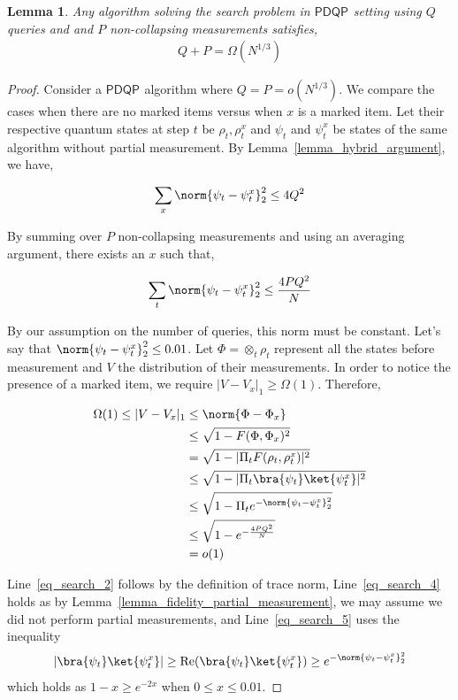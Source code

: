 \documentclass[10pt,a4paper]{article}
\newcommand{\queryamount}[0]{\ensuremath{Q}\xspace}
\newcommand{\abilityamount}[0]{\ensuremath{P}\xspace} %
\newcommand{\compclass}[2][]{\ensuremath{\mathsf{#2}^{#1}}\xspace}
\newcommand{\pdqpname}[0]{\compclass{PDQP}}
\newtheorem{lemma}[theorem]{Lemma}
\begin{document}
\begin{lemma}\label{lemma_lowerbound_search}
    Any algorithm solving the search problem in \pdqpname setting using \queryamount queries and and \abilityamount non-collapsing measurements satisfies,
    \begin{align*}
        \queryamount+\abilityamount = \Omega(N^{1/3})
    \end{align*}
\end{lemma}
\begin{proof}

Consider a \pdqpname algorithm where $Q=P = o(N^{1/3})$. We compare the cases when there are no marked items versus when $x$ is a marked item. Let their respective quantum states at step $t$ be $\rho_t, \rho_t^x$ and $\psi_t$ and $\psi_t^x$ be states of the same algorithm without partial measurement. By Lemma~\ref{lemma_hybrid_argument}, we have,

\begin{align*}
    \sum_x \norm{\psi_t-\psi_t^x}^2_2 \leq 4Q^2
\end{align*}

By summing over $P$ non-collapsing measurements and using an averaging argument, there exists an $x$ such that,

\begin{align*}
\sum_t \norm{\psi_t - \psi_t^x}^2_2 \leq \frac{4PQ^2}{N}
\end{align*}

By our assumption on the number of queries, this norm must be constant. Let's say that $\norm{\psi_t-\psi_t^x}_2^2 \leq 0.01$. Let $\Phi=\otimes_t \rho_t$ represent all the states before measurement and $V$ the distribution of their measurements. In order to notice the presence of a marked item, we require $|V-V_x|_1\geq \Omega(1)$. Therefore,

\begin{align}
    \Omega(1)\leq |V-V_x|_1 &\leq \norm{\Phi - \Phi_x} \label{eq_search_1}\\
    &\leq \sqrt{1-F(\Phi, \Phi_x)^2}\label{eq_search_2}\\
    & =\sqrt{1-|\Pi_t F(\rho_t, \rho_t^x)|^2}\label{eq_search_3}\\
    &\leq \sqrt{1-|\Pi_t \bra{\psi_t}\ket{ \psi_t^x}|^2}\label{eq_search_4}\\
    &\leq \sqrt{1-\Pi_t e^{-\norm{\psi_t-\psi_t^x}^2_2}}\label{eq_search_5}\\
    &\leq \sqrt{1 - e^{-\frac{4PQ^2}{N}}}\label{eq_search_6}\\
    &=o(1)
\end{align}

Line~\ref{eq_search_2} follows by the definition of trace norm, Line~\ref{eq_search_4} holds as by Lemma~\ref{lemma_fidelity_partial_measurement}, we may assume we did not perform partial measurements, and Line~\ref{eq_search_5} uses the inequality 
\begin{align*}
    |\bra{\psi_t}\ket{\psi_t^x}|\geq \text{Re}(\bra{\psi_t}\ket{\psi_t^x})\geq e^{-\norm{\psi_t-\psi_t^x}^2_2}
\end{align*}
which holds as $1-x\geq e^{-2x}$ when $0\leq x\leq 0.01$.
\end{proof}
\end{document}
